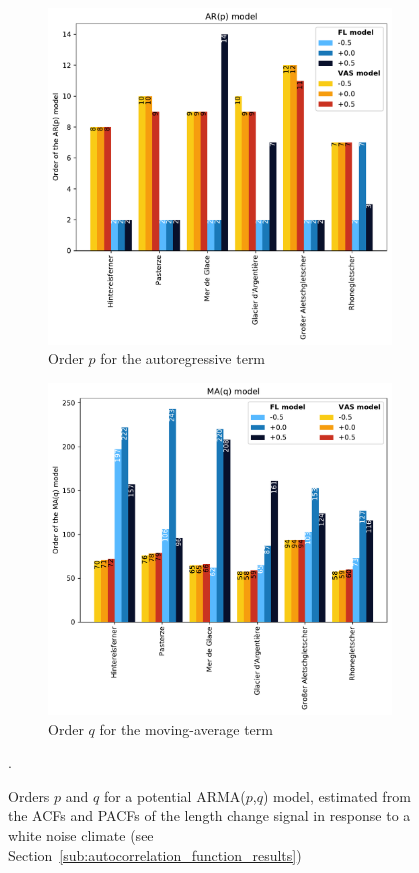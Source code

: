 \begin{figure}[p]
  \centering

  \begin{subfigure}[b]{0.6\textwidth}
    \caption{Order $p$ for the autoregressive term}
    \label{fig:arma:arp}
    \centering
    \includegraphics[width=\textwidth]{../plots/final_plots/arma/arp.pdf}
  \end{subfigure}
  \hfill
  \begin{subfigure}[b]{0.6\textwidth}
    \caption{Order $q$ for the moving-average term}
    \label{fig:arma:maq}
    \centering
    \includegraphics[width=\textwidth]{../plots/final_plots/arma/maq.pdf}
  \end{subfigure}
  
  \caption{Orders $p$ and $q$ for a potential ARMA($p$,$q$) model, estimated from the ACFs and PACFs of the length change signal in response to a white noise climate (see Section~\ref{sub:autocorrelation_function_results})}.
  \label{fig:arma}
\end{figure}

